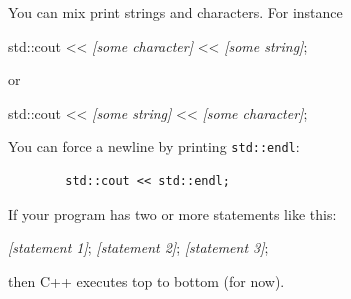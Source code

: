 You can mix print strings and characters. For instance
\begin{console}[frame=none, commandchars=\\\{\}]

        std::cout << \textit{[some character]}
	          << \textit{[some string]};

\end{console}
or
\begin{console}[frame=none, commandchars=\\\{\}]

        std::cout << \textit{[some string]}
	          << \textit{[some character]};

\end{console}
You can force a newline by printing \verb!std::endl!:
\begin{verbatim}
        std::cout << std::endl;
\end{verbatim}



If your program has two or more statements like this:
\begin{console}[frame=none, commandchars=\\\{\}]

        \textit{[statement 1]};
        \textit{[statement 2]};
        \textit{[statement 3]};

\end{console}
then C++ executes top to bottom (for now).

